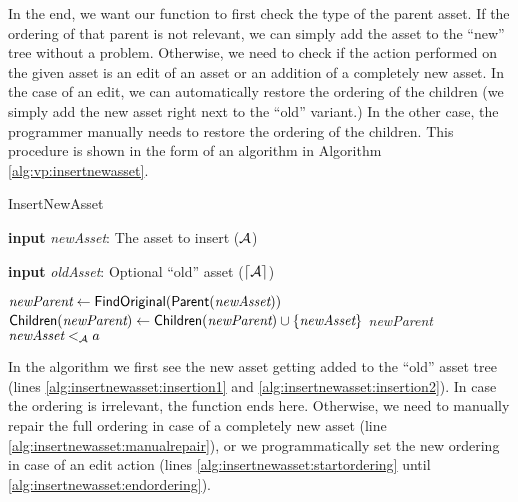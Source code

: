 In the end, we want our function to first check the type of the parent asset.
If the ordering of that parent is not relevant, we can simply add the asset to
the ``new'' tree without a problem. Otherwise, we need to check if the action
performed on the given asset is an edit of an asset or an addition of a 
completely new asset. In the case of an edit, we can automatically restore the
ordering of the children (we simply add the new asset right next to the
``old'' variant.) In the other case, the programmer manually needs to restore
the ordering of the children. This procedure is shown in the form of an
algorithm in Algorithm \ref{alg:vp:insertnewasset}. 

\begin{algorithm}
  \caption{{\sc InsertNewAsset}}
  \label{alg:vp:insertnewasset}
  \begin{algorithmic}[1]
    \item[] {\bf input} \textit{newAsset}: The asset to insert (\(\mathcal{A}\))
    \item[] {\bf input} \textit{oldAsset}: Optional ``old'' asset (\(\lceil \mathcal{A} \rceil\))
    \item[]
    \STATE $\textit{newParent} \gets {\sf FindOriginal}({\sf Parent}(\textit{newAsset}))$ \label{alg:insertnewasset:insertion1}
    \STATE ${\sf Children}(\textit{newParent}) \gets {\sf Children}(\textit{newParent}) \cup \left\{ \textit{newAsset} \right\}$ \label{alg:insertnewasset:insertion2}
         {\it newParent} \label{alg:insertnewasset:manualrepair}
      \ELSE
         \label{alg:insertnewasset:startordering}
             $\textit{newAsset} <_{\mathcal{A}} a$
          \ENDIF
        \ENDFOR \label{alg:insertnewasset:endordering}
      \ENDIF  
    \ENDIF
  \end{algorithmic}
\end{algorithm}

In the algorithm we first see the new asset getting added to the ``old'' asset
tree (lines \ref{alg:insertnewasset:insertion1} and
\ref{alg:insertnewasset:insertion2}). In case the ordering is irrelevant, the
function ends here. Otherwise, we need to manually repair the full ordering in
case of a completely new asset (line \ref{alg:insertnewasset:manualrepair}), or
we programmatically set the new ordering in case of an edit action (lines
\ref{alg:insertnewasset:startordering} until
\ref{alg:insertnewasset:endordering}).

